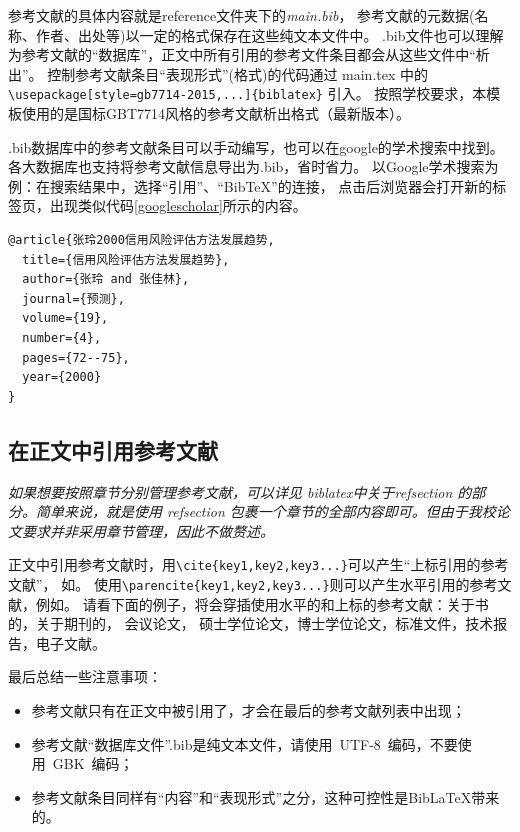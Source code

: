 参考文献的具体内容就是reference文件夹下的\textit{main.bib}，
参考文献的元数据(名称、作者、出处等)以一定的格式保存在这些纯文本文件中。
.bib文件也可以理解为参考文献的``数据库''，正文中所有引用的参考文件条目都会从这些文件中``析出''。
控制参考文献条目``表现形式''(格式)的代码通过 main.tex 中的 \\ \verb|\usepackage[style=gb7714-2015,...]{biblatex}| 引入。
按照学校要求，本模板使用的是国标GBT7714风格的参考文献析出格式（最新版本）。

.bib数据库中的参考文献条目可以手动编写，也可以在google的学术搜索中找到。
各大数据库也支持将参考文献信息导出为.bib，省时省力。
以Google学术搜索为例：在搜索结果中，选择``引用''、``BibTeX''的连接，
点击后浏览器会打开新的标签页，出现类似代码\ref{googlescholar}所示的内容。

\begin{lstlisting}[caption={从Google Scholar找到的，但并不规范的.bib条目}, label=googlescholar, float, escapeinside="", numbers=none]
@article{张玲2000信用风险评估方法发展趋势,
  title={信用风险评估方法发展趋势},
  author={张玲 and 张佳林},
  journal={预测},
  volume={19},
  number={4},
  pages={72--75},
  year={2000}
}
\end{lstlisting}

\subsection{在正文中引用参考文献}

\textit{如果想要按照章节分别管理参考文献，可以详见 biblatex中关于refsection 的部分。简单来说，就是使用 refsection 包裹一个章节的全部内容即可。但由于我校论文要求并非采用章节管理，因此不做赘述。}

正文中引用参考文献时\cite{Jiang2005Size}，用\verb+\cite{key1,key2,key3...}+可以产生“上标引用的参考文献”，
如\cite{Meta_CN,chen2007act,DPMG}。
使用\verb+\parencite{key1,key2,key3...}+则可以产生水平引用的参考文献，例如\parencite{JohnD,zhubajie,IEEE-1363}。
请看下面的例子，将会穿插使用水平的和上标的参考文献：关于书的\parencite{Meta_CN,JohnD,IEEE-1363}，关于期刊的\cite{chen2007act,chen2007ewi}，
会议论文\cite{DPMG,kocher99,cnproceed}，
硕士学位论文\cite{zhubajie,metamori2004}，博士学位论文\cite{shaheshang,FistSystem01,bai2008}，标准文件\cite{IEEE-1363}，技术报告\cite{NPB2}，电子文献\cite{xiaoyu2001, CHRISTINE1998}。

最后总结一些注意事项：
\begin{itemize}
\item  参考文献只有在正文中被引用了，才会在最后的参考文献列表中出现；
\item  参考文献``数据库文件''.bib是纯文本文件，请使用~UTF-8~编码，不要使用~GBK~编码；
\item  参考文献条目同样有“内容”和“表现形式”之分，这种可控性是BibLaTeX带来的。
\end{itemize}


